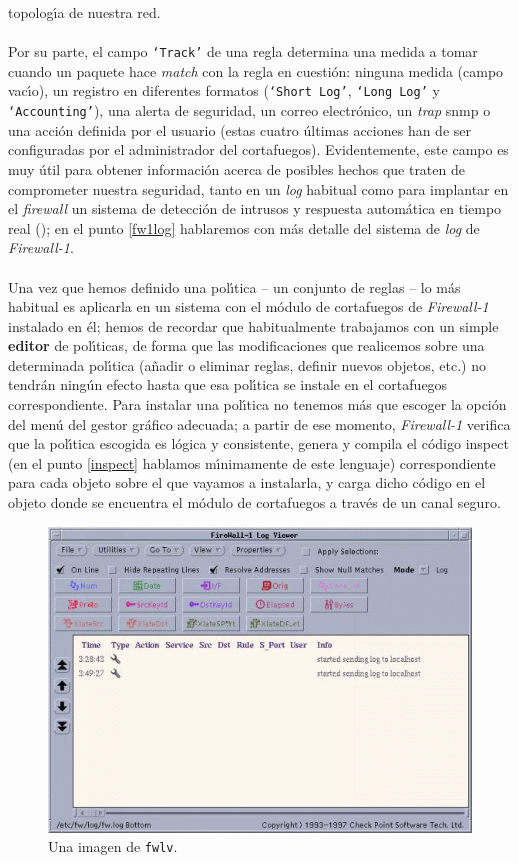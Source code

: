 topolog\'{\i}a de nuestra red.\\
\\Por su parte, el campo {\tt `Track'} de una regla determina una medida a 
tomar cuando un paquete hace {\it match} con la regla en cuesti\'on: ninguna
medida (campo vac\'{\i}o), un registro en diferentes formatos ({\tt `Short 
Log'}, {\tt `Long Log'} y {\tt `Accounting'}), una alerta de seguridad, un 
correo electr\'onico, un {\it trap} {\sc snmp} o una acci\'on definida por el
usuario (estas cuatro \'ultimas acciones han de ser configuradas por el 
administrador del cortafuegos). Evidentemente, este campo es muy \'util para 
obtener informaci\'on acerca de posibles hechos que traten de comprometer 
nuestra seguridad, tanto en un {\it log} habitual como para implantar en el {\it
firewall} un sistema de detecci\'on de intrusos y respuesta autom\'atica en
tiempo real (\cite{kn:spi01b}); en el punto \ref{fw1log} hablaremos con m\'as
detalle del sistema de {\it log} de {\it Firewall-1}.\\
\\Una vez que hemos definido una pol\'{\i}tica -- un conjunto de reglas -- lo
m\'as habitual es aplicarla en un sistema con el m\'odulo de cortafuegos de {\it
Firewall-1} instalado en \'el; hemos de recordar que habitualmente trabajamos 
con un simple {\bf editor} de pol\'{\i}ticas, de forma que las modificaciones 
que realicemos sobre una determinada pol\'{\i}tica (a\~nadir o eliminar reglas,
definir nuevos objetos, etc.) no tendr\'an ning\'un efecto hasta que esa 
pol\'{\i}tica se instale en el cortafuegos correspondiente. Para instalar una
pol\'{\i}tica no tenemos m\'as que escoger la opci\'on del men\'u del gestor
gr\'afico adecuada; a partir de ese momento, {\it Firewall-1} verifica que la 
pol\'{\i}tica escogida es l\'ogica y consistente, genera y compila el c\'odigo 
{\sc inspect} (en el punto \ref{inspect} hablamos m\'{\i}nimamente de este
lenguaje) correspondiente para cada objeto sobre el que vayamos a instalarla, y 
carga dicho c\'odigo en el objeto donde se encuentra el m\'odulo de cortafuegos
a trav\'es de un canal seguro.
\begin{figure}
\includegraphics[width=\textwidth]{fwlv.png}
\caption{Una imagen de {\tt fwlv}.}
\label{fwlv}
\end{figure}
